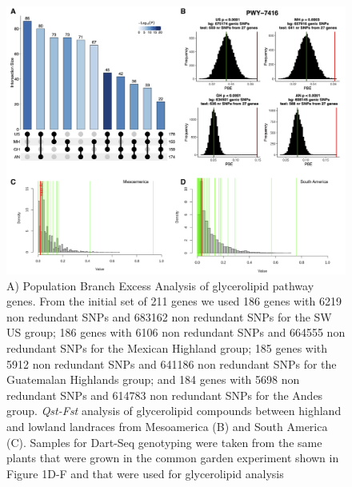 \documentclass[9pt,twocolumn,twoside,lineno]{gsajnl}
\begin{document}
\begin{figure}[t]
\begin{center}
\includegraphics[width=0.8\paperwidth]{Sup_Figures/Sup_Fig_1.png}
\caption{A) Population Branch Excess Analysis of glycerolipid pathway genes. From the initial set of 211 genes we used 186 genes with 6219 non redundant SNPs and 683162 non redundant SNPs for the SW US group; 186 genes with 6106 non redundant SNPs and 664555 non redundant SNPs for the Mexican Highland group; 185 genes with 5912 non redundant SNPs and 641186 non redundant SNPs for the Guatemalan Highlands group; and 184 genes with 5698 non redundant SNPs and 614783 non redundant SNPs for the Andes group.    
\textit{Qst-Fst} analysis of glycerolipid compounds between highland and lowland landraces from Mesoamerica (B) and South America (C). Samples for Dart-Seq genotyping were taken from the same plants that were grown in the common garden experiment shown in Figure 1D-F and that were used for glycerolipid analysis   
}
\label{SupFig1}
\end{center}
\end{figure} 
\end{document}
